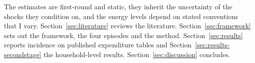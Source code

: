 The estimates are first-round and static, they inherit the
uncertainty of the shocks they condition on, and the energy levels
depend on stated conventions that I vary. Section~\ref{sec:literature}
reviews the literature. Section~\ref{sec:framework} sets out the
framework, the four episodes and the method.
Section~\ref{sec:results} reports incidence on published expenditure
tables and Section~\ref{sec:results-secondstage} the household-level
results. Section~\ref{sec:discussion} concludes.
